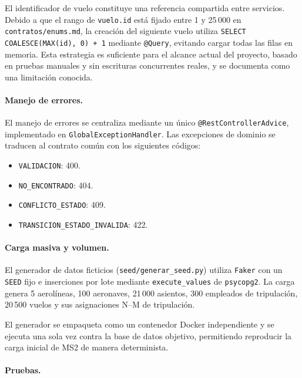 El identificador de vuelo constituye una referencia compartida entre
servicios. Debido a que el rango de \texttt{vuelo.id} está fijado entre
1 y 25\,000 en \texttt{contratos/enums.md}, la creación del siguiente
vuelo utiliza
\texttt{SELECT COALESCE(MAX(id), 0) + 1} mediante \texttt{@Query},
evitando cargar todas las filas en memoria. Esta estrategia es
suficiente para el alcance actual del proyecto, basado en pruebas
manuales y sin escrituras concurrentes reales, y se documenta como una
limitación conocida.

\paragraph{Manejo de errores.}

El manejo de errores se centraliza mediante un único
\texttt{@RestControllerAdvice}, implementado en
\texttt{GlobalExceptionHandler}. Las excepciones de dominio se traducen
al contrato común con los siguientes códigos:

\begin{itemize}
  \item \texttt{VALIDACION}: 400.
  \item \texttt{NO\_ENCONTRADO}: 404.
  \item \texttt{CONFLICTO\_ESTADO}: 409.
  \item \texttt{TRANSICION\_ESTADO\_INVALIDA}: 422.
\end{itemize}

\paragraph{Carga masiva y volumen.}

El generador de datos ficticios
(\texttt{seed/generar\_seed.py}) utiliza \texttt{Faker} con un
\texttt{SEED} fijo e inserciones por lote mediante
\texttt{execute\_values} de \texttt{psycopg2}. La carga genera
5 aerolíneas, 100 aeronaves, 21\,000 asientos, 300 empleados de
tripulación, 20\,500 vuelos y sus asignaciones N--M de tripulación.

El generador se empaqueta como un contenedor Docker independiente y se
ejecuta una sola vez contra la base de datos objetivo, permitiendo
reproducir la carga inicial de MS2 de manera determinista.

\paragraph{Pruebas.}


